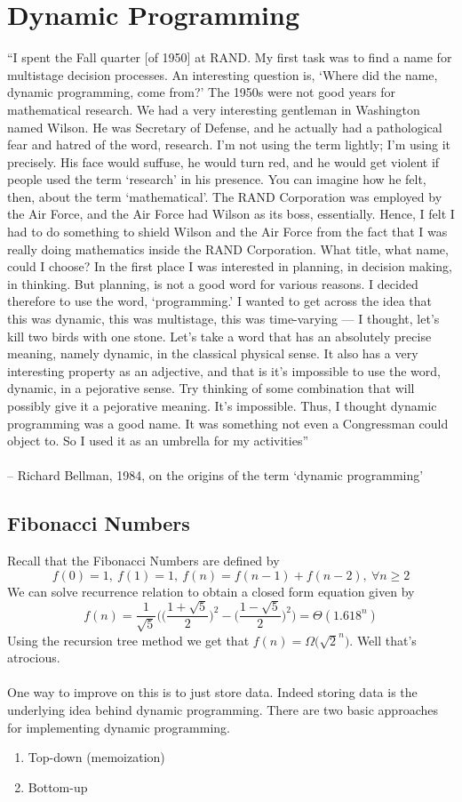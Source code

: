 \documentclass{article}
\begin{document}
\section{Dynamic Programming}
\hspace*{10mm}``I spent the Fall quarter [of 1950] at RAND. My first task was to find a name for multistage decision processes. An interesting question is, `Where did the name, dynamic programming, come from?' The 1950s were not good years for mathematical research. We had a very interesting gentleman in Washington named Wilson. He was Secretary of Defense, and he actually had a pathological fear and hatred of the word, research. I'm not using the term lightly; I'm using it precisely. His face would suffuse, he would turn red, and he would get violent if people used the term `research' in his presence. You can imagine how he felt, then, about the term `mathematical'. The RAND Corporation was employed by the Air Force, and the Air Force had Wilson as its boss, essentially. Hence, I felt I had to do something to shield Wilson and the Air Force from the fact that I was really doing mathematics inside the RAND Corporation. What title, what name, could I choose? In the first place I was interested in planning, in decision making, in thinking. But planning, is not a good word for various reasons. I decided therefore to use the word, `programming.' I wanted to get across the idea that this was dynamic, this was multistage, this was time-varying --- I thought, let's kill two birds with one stone. Let's take a word that has an absolutely precise meaning, namely dynamic, in the classical physical sense. It also has a very interesting property as an adjective, and that is it's impossible to use the word, dynamic, in a pejorative sense. Try thinking of some combination that will possibly give it a pejorative meaning. It's impossible. Thus, I thought dynamic programming was a good name. It was something not even a Congressman could object to. So I used it as an umbrella for my activities''\\\\
-- Richard Bellman, 1984, on the origins of the term `dynamic programming'
\subsection{Fibonacci Numbers}
Recall that the Fibonacci Numbers are defined by
\[f(0) = 1,\ f(1) = 1,\ f(n) = f(n-1) + f(n-2),\ \forall n \geq 2\]
We can solve recurrence relation to obtain a closed form equation given by
\[f(n) = \frac{1}{\sqrt{5}}\Bigg(\bigg(\frac{1+\sqrt{5}}{2}\bigg)^2 - \bigg(\frac{1-\sqrt{5}}{2}\bigg)^2\Bigg) = \Theta(1.618^n)\]
Using the recursion tree method we get that $f(n) = \Omega\big(\sqrt{2}^n\big)$. Well that's atrocious.\\\\
One way to improve on this is to just store data. Indeed storing data is the underlying idea behind dynamic programming. There are two basic approaches for implementing dynamic programming.
\begin{enumerate}
	\item Top-down (memoization)
	\item Bottom-up
\end{enumerate}
\end{document}
